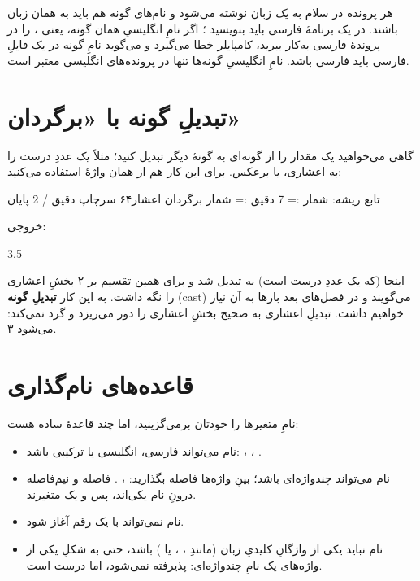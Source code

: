 \begin{tip}
هر پرونده در سلام به \emph{یک} زبان نوشته می‌شود و نام‌های گونه هم باید به همان
زبان باشند. در یک برنامهٔ فارسی باید بنویسید ؛ اگر
نامِ انگلیسیِ همان گونه، یعنی ، را در پروندهٔ فارسی به‌کار ببرید،
کامپایلر خطا می‌گیرد و می‌گوید نامِ گونه در یک فایلِ فارسی باید فارسی باشد.
نامِ انگلیسیِ گونه‌ها تنها در پرونده‌های انگلیسی معتبر است.
\end{tip}

\section{تبدیلِ گونه با «برگردان»}

گاهی می‌خواهید یک مقدار را از گونه‌ای به گونهٔ دیگر تبدیل کنید؛ مثلاً یک عددِ
درست را به اعشاری، یا برعکس. برای این کار هم از همان واژهٔ  استفاده
می‌کنید:

\begin{salamfa}
تابع ریشه:
    شمار := 7
    دقیق := شمار برگردان اعشار۶۴
    سرچاپ دقیق / 2
پایان
\end{salamfa}

خروجی:

\begin{salamen}[language={}]
3.5
\end{salamen}

اینجا  (که یک عددِ درست است) به  تبدیل شد و برای همین
تقسیم بر ۲ بخشِ اعشاری را نگه داشت. به این کار \textbf{تبدیلِ گونه} (cast)
می‌گویند و در فصل‌های بعد بارها به آن نیاز خواهیم داشت. تبدیلِ اعشاری به صحیح
بخشِ اعشاری را دور می‌ریزد و گرد نمی‌کند:  می‌شود ۳.

\section{قاعده‌های نام‌گذاری}

نامِ متغیرها را خودتان برمی‌گزینید، اما چند قاعدهٔ ساده هست:

\begin{itemize}
  \item نام می‌تواند فارسی، انگلیسی یا ترکیبی باشد: ، ،
        .
  \item نام می‌تواند چندواژه‌ای باشد؛ بینِ واژه‌ها فاصله بگذارید:
        ، . فاصله و نیم‌فاصله درونِ نام
        یکی‌اند، پس  و  یک متغیرند.
  \item نام نمی‌تواند با یک رقم آغاز شود.
  \item نام نباید یکی از واژگانِ کلیدیِ زبان (مانندِ ، ،
         یا ) باشد، حتی به شکلِ یکی از واژه‌های یک نامِ
        چندواژه‌ای:  پذیرفته نمی‌شود، اما
         درست است.
\end{itemize}

